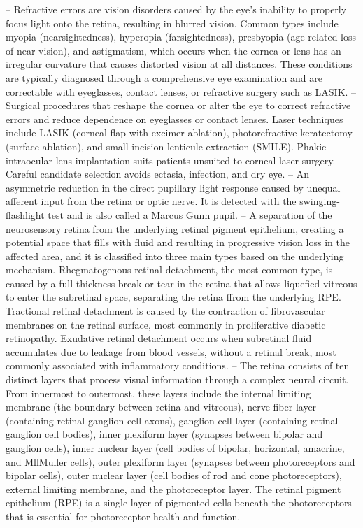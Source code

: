 -- Refractive errors are vision disorders caused by the eye's inability to properly focus light onto the retina, resulting in blurred vision. Common types include myopia (nearsightedness), hyperopia (farsightedness), presbyopia (age-related loss of near vision), and astigmatism, which occurs when the cornea or lens has an irregular curvature that causes distorted vision at all distances. These conditions are typically diagnosed through a comprehensive eye examination and are correctable with eyeglasses, contact lenses, or refractive surgery such as LASIK.
-- Surgical procedures that reshape the cornea or alter the eye to correct refractive errors and reduce dependence on eyeglasses or contact lenses. Laser techniques include LASIK (corneal flap with excimer ablation), photorefractive keratectomy (surface ablation), and small-incision lenticule extraction (SMILE). Phakic intraocular lens implantation suits patients unsuited to corneal laser surgery. Careful candidate selection avoids ectasia, infection, and dry eye.
-- An asymmetric reduction in the direct pupillary light response caused by unequal afferent input from the retina or optic nerve. It is detected with the swinging-flashlight test and is also called a Marcus Gunn pupil.
-- A separation of the neurosensory retina from the underlying retinal pigment epithelium, creating a potential space that fills with fluid and resulting in progressive vision loss in the affected area, and it is classified into three main types based on the underlying mechanism. Rhegmatogenous retinal detachment, the most common type, is caused by a full-thickness break or tear in the retina that allows liquefied vitreous to enter the subretinal space, separating the retina ffrom the underlying RPE. Tractional retinal detachment is caused by the contraction of fibrovascular membranes on the retinal surface, most commonly in proliferative diabetic retinopathy. Exudative retinal detachment occurs when subretinal fluid accumulates due to leakage from blood vessels, without a retinal break, most commonly associated with inflammatory conditions.
-- The retina consists of ten distinct layers that process visual information through a complex neural circuit. From innermost to outermost, these layers include the internal limiting membrane (the boundary between retina and vitreous), nerve fiber layer (containing retinal ganglion cell axons), ganglion cell layer (containing retinal ganglion cell bodies), inner plexiform layer (synapses between bipolar and ganglion cells), inner nuclear layer (cell bodies of bipolar, horizontal, amacrine, and MllMuller cells), outer plexiform layer (synapses between photoreceptors and bipolar cells), outer nuclear layer (cell bodies of rod and cone photoreceptors), external limiting membrane, and the photoreceptor layer. The retinal pigment epithelium (RPE) is a single layer of pigmented cells beneath the photoreceptors that is essential for photoreceptor health and function.
